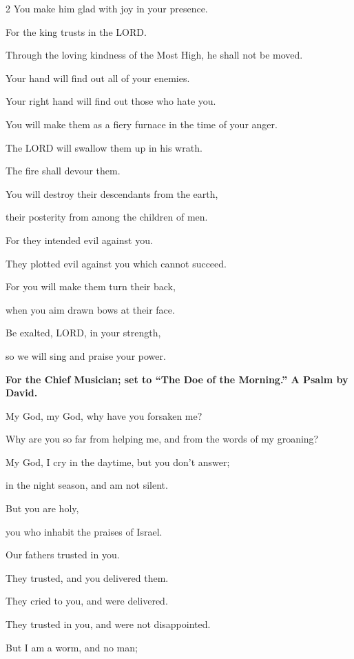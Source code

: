 \begin{multicols}{2}
	You make him glad with joy in your presence.
	
	
	\myverse{}For the king trusts in the LORD.
	
	Through the loving kindness of the Most High, he shall not be moved.
	
	
	\myverse{}Your hand will find out all of your enemies.
	
	Your right hand will find out those who hate you.
	
	
	\myverse{}You will make them as a fiery furnace in the time of your anger.
	
	The LORD will swallow them up in his wrath.
	
	The fire shall devour them.
	
	
	\myverse{}You will destroy their descendants from the earth,
	
	their posterity from among the children of men.
	
	
	\myverse{}For they intended evil against you.
	
	They plotted evil against you which cannot succeed.
	
	
	\myverse{}For you will make them turn their back,
	
	when you aim drawn bows at their face.
	
	
	\myverse{}Be exalted, LORD, in your strength,
	
	so we will sing and praise your power.
	
	
	\mychapter{}\textbf{For the Chief Musician; set to “The Doe of the Morning.” A Psalm by David.}
	
	\myverse*{}My God, my God, why have you forsaken me?
	
	Why are you so far from helping me, and from the words of my groaning?
	
	
	\myverse{}My God, I cry in the daytime, but you don’t answer;
	
	in the night season, and am not silent.
	
	
	\myverse{}But you are holy,
	
	you who inhabit the praises of Israel.
	
	
	\myverse{}Our fathers trusted in you.
	
	They trusted, and you delivered them.
	
	
	\myverse{}They cried to you, and were delivered.
	
	They trusted in you, and were not disappointed.
	
	
	\myverse{}But I am a worm, and no man;
	

\end{multicols}
